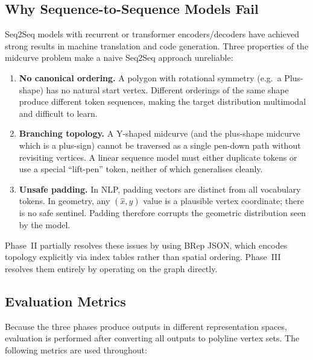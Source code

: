 \documentclass[journal]{IEEEtran}
\begin{document}
\subsection{Why Sequence-to-Sequence Models Fail}

Seq2Seq models with recurrent or transformer encoders/decoders have achieved
strong results in machine translation and code generation.  Three properties of
the midcurve problem make a naive Seq2Seq approach unreliable:

\begin{enumerate}
  \item \textbf{No canonical ordering.}  A polygon with rotational symmetry
        (e.g.\ a Plus-shape) has no natural start vertex.  Different orderings
        of the same shape produce different token sequences, making the target
        distribution multimodal and difficult to learn.

  \item \textbf{Branching topology.}  A Y-shaped midcurve (and the plus-shape
        midcurve which is a plus-sign) cannot be traversed as a single
        pen-down path without revisiting vertices.  A linear sequence model
        must either duplicate tokens or use a special ``lift-pen'' token,
        neither of which generalises cleanly.

  \item \textbf{Unsafe padding.}  In NLP, padding vectors are distinct from
        all vocabulary tokens.  In geometry, any $(\hat{x}, \hat{y})$ value is
        a plausible vertex coordinate; there is no safe sentinel.  Padding
        therefore corrupts the geometric distribution seen by the model.
\end{enumerate}

Phase~II partially resolves these issues by using BRep JSON, which encodes
topology explicitly via index tables rather than spatial ordering.  Phase~III
resolves them entirely by operating on the graph directly.

\subsection{Evaluation Metrics}
\label{sec:metrics}

Because the three phases produce outputs in different representation spaces,
evaluation is performed after converting all outputs to polyline vertex sets.
The following metrics are used throughout:
\end{document}
